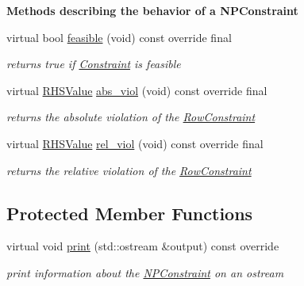 \begin{Indent}\textbf{ Methods describing the behavior of a N\+P\+Constraint}\par
\begin{DoxyCompactItemize}
\item 
virtual bool \mbox{\hyperlink{class_s_m_spp__di__unipi__it_1_1_n_p_constraint_a575ce9dd82d423f5d6e9699622935415}{feasible}} (void) const override final
\begin{DoxyCompactList}\small\item\em returns true if \mbox{\hyperlink{class_s_m_spp__di__unipi__it_1_1_constraint}{Constraint}} is feasible \end{DoxyCompactList}\item 
virtual \mbox{\hyperlink{class_s_m_spp__di__unipi__it_1_1_row_constraint_a8813536ab3b13a81c8e83a999ade3bd8}{R\+H\+S\+Value}} \mbox{\hyperlink{class_s_m_spp__di__unipi__it_1_1_n_p_constraint_a1e06e555eab5078e4d5ec16745778984}{abs\+\_\+viol}} (void) const override final
\begin{DoxyCompactList}\small\item\em returns the absolute violation of the \mbox{\hyperlink{class_s_m_spp__di__unipi__it_1_1_row_constraint}{Row\+Constraint}} \end{DoxyCompactList}\item 
virtual \mbox{\hyperlink{class_s_m_spp__di__unipi__it_1_1_row_constraint_a8813536ab3b13a81c8e83a999ade3bd8}{R\+H\+S\+Value}} \mbox{\hyperlink{class_s_m_spp__di__unipi__it_1_1_n_p_constraint_a44cb3a18055d2b46764d4eb21a0ff032}{rel\+\_\+viol}} (void) const override final
\begin{DoxyCompactList}\small\item\em returns the relative violation of the \mbox{\hyperlink{class_s_m_spp__di__unipi__it_1_1_row_constraint}{Row\+Constraint}} \end{DoxyCompactList}\end{DoxyCompactItemize}
\end{Indent}
\subsection*{Protected Member Functions}
\begin{DoxyCompactItemize}
\item 
\mbox{\label{class_s_m_spp__di__unipi__it_1_1_n_p_constraint_a59a9fcbf8f9f86d348344b2073644b0e}} 
virtual void \mbox{\hyperlink{class_s_m_spp__di__unipi__it_1_1_n_p_constraint_a59a9fcbf8f9f86d348344b2073644b0e}{print}} (std\+::ostream \&output) const override
\begin{DoxyCompactList}\small\item\em print information about the \mbox{\hyperlink{class_s_m_spp__di__unipi__it_1_1_n_p_constraint}{N\+P\+Constraint}} on an ostream \end{DoxyCompactList}\end{DoxyCompactItemize}
